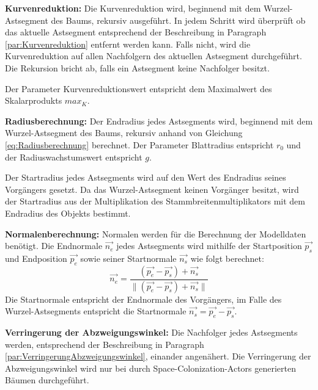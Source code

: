 \begin{description}
	\item \textbf{Kurvenreduktion:} Die Kurvenreduktion wird, beginnend mit dem Wurzel-Astsegment des Baums, rekursiv ausgeführt. In jedem Schritt wird überprüft ob das aktuelle Astsegment entsprechend der Beschreibung in Paragraph \ref{par:Kurvenreduktion} entfernt werden kann. Falls nicht, wird die Kurvenreduktion auf allen Nachfolgern des aktuellen Astsegment durchgeführt. Die Rekursion bricht ab, falls ein Astsegment keine Nachfolger besitzt.
	
	Der Parameter \glqq Kurvenreduktionswert\grqq{} entspricht dem Maximalwert des Skalarprodukts $max_K$.\\
	
	\item \textbf{Radiusberechnung:} Der Endradius jedes Astsegments wird, beginnend mit dem Wurzel-Astsegment des Baums, rekursiv anhand von Gleichung \ref{eq:Radiusberechnung} berechnet. Der Parameter \glqq Blattradius\grqq{} entspricht $r_0$ und der \glqq Radiuswachstumswert\grqq{} entspricht $g$. 
	
	Der Startradius jedes Astsegments wird auf den Wert des Endradius seines Vorgängers gesetzt. Da das Wurzel-Astsegment keinen Vorgänger besitzt, wird der Startradius aus der Multiplikation des Stammbreitenmultiplikators mit dem Endradius des Objekts bestimmt.\\
	
	\item \textbf{Normalenberechnung:} Normalen werden für die Berechnung der Modelldaten benötigt. Die Endnormale $\overrightarrow{n_{e}}$ jedes Astsegments wird mithilfe der Startposition $\overrightarrow{p_{s}}$ und Endposition $\overrightarrow{p_{e}}$ sowie seiner Startnormale $\overrightarrow{n_{s}}$ wie folgt berechnet:
	\begin{equation}
		\overrightarrow{n_{e}} = \dfrac{(\overrightarrow{p_{e}} - \overrightarrow{p_{s}}) + \overrightarrow{n_{s}}}{\lVert (\overrightarrow{p_{e}} - \overrightarrow{p_{s}}) + \overrightarrow{n_{s}} \rVert}
	\end{equation}
	Die Startnormale entspricht der Endnormale des Vorgängers, im Falle des Wurzel-Astsegments entspricht die Startnormale $\overrightarrow{n_s} = \overrightarrow{p_{e}} - \overrightarrow{p_{s}}$. \\
	
	
	\item \textbf{Verringerung der Abzweigungswinkel:} Die Nachfolger jedes Astsegments werden, entsprechend der Beschreibung in Paragraph \ref{par:VerringerungAbzweigungswinkel}, einander angenähert. Die Verringerung der Abzweigungswinkel wird nur bei durch Space-Colonization-Actors generierten Bäumen durchgeführt.
\end{description}


